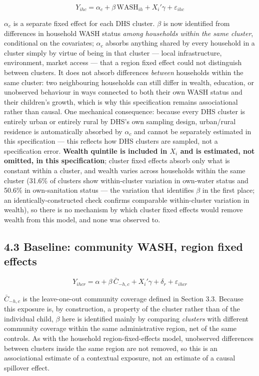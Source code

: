 $$Y_{ihc} = \alpha_c + \beta\,\text{WASH}_{ih} + X_i'\gamma + \varepsilon_{ihc}$$

$\alpha_c$ is a separate fixed effect for each DHS cluster. $\beta$ is now identified from differences in household WASH status \textit{among households within the same cluster}, conditional on the covariates; $\alpha_c$ absorbs anything shared by every household in a cluster simply by virtue of being in that cluster --- local infrastructure, environment, market access --- that a region fixed effect could not distinguish between clusters. It does not absorb differences \textit{between} households within the same cluster: two neighbouring households can still differ in wealth, education, or unobserved behaviour in ways connected to both their own WASH status and their children's growth, which is why this specification remains associational rather than causal. One mechanical consequence: because every DHS cluster is entirely urban or entirely rural by DHS's own sampling design, urban/rural residence is automatically absorbed by $\alpha_c$ and cannot be separately estimated in this specification --- this reflects how DHS clusters are sampled, not a specification error. \textbf{Wealth quintile is included in $X_i$ and is estimated, not omitted, in this specification}; cluster fixed effects absorb only what is constant within a cluster, and wealth varies across households within the same cluster (31.6\% of clusters show within-cluster variation in own-water status and 50.6\% in own-sanitation status --- the variation that identifies $\beta$ in the first place; an identically-constructed check confirms comparable within-cluster variation in wealth), so there is no mechanism by which cluster fixed effects would remove wealth from this model, and none was observed to.

\subsection*{4.3 Baseline: community WASH, region fixed effects}

$$Y_{ihcr} = \alpha + \beta\,\bar{C}_{-h,c} + X_i'\gamma + \delta_r + \varepsilon_{ihcr}$$

$\bar{C}_{-h,c}$ is the leave-one-out community coverage defined in Section 3.3. Because this exposure is, by construction, a property of the cluster rather than of the individual child, $\beta$ here is identified mainly by comparing \textit{clusters} with different community coverage within the same administrative region, net of the same controls. As with the household region-fixed-effects model, unobserved differences between clusters inside the same region are not removed, so this is an associational estimate of a contextual exposure, not an estimate of a causal spillover effect.

